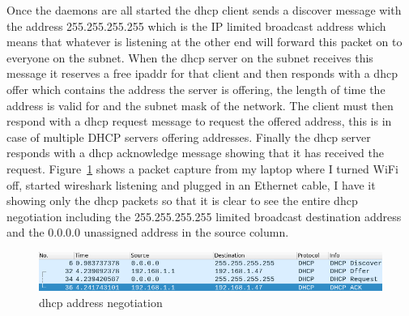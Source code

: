\documentclass[titlepage]{article}
\begin{document}
Once the \glspl{daemon} are all started the \gls{dhcp} client sends a discover message with the address
255.255.255.255 which is the IP limited broadcast address which means that whatever is listening at the
other end will forward this packet on to everyone on the \gls{subnet}. When the \gls{dhcp} \gls{server} on the subnet
receives this message it reserves a free \gls{ipaddr} for that client and then responds with a \gls{dhcp} offer
which contains the address the \gls{server} is offering, the length of time the address is valid for and the
\gls{subnet} mask of the network. The client must then respond with a \gls{dhcp} request message to request the
offered address, this is in case of multiple DHCP servers offering addresses. Finally the \gls{dhcp} server responds
with a \gls{dhcp} acknowledge message showing that it has received the request. Figure~\ref{dhcp_negotiate} shows
a packet capture from my laptop where I turned WiFi off, started wireshark listening and plugged in an Ethernet
cable, I have it showing only the \gls{dhcp} packets so that it is clear to see the entire \gls{dhcp} negotiation
including the 255.255.255.255 limited broadcast destination address and the 0.0.0.0 unassigned address in the source
column.

\begin{figure}[H]
  \centering
  \includegraphics[width=\textwidth]{screenshots/dhcp_negotiation.png}
  \caption{\gls{dhcp} address negotiation}\label{dhcp_negotiate}
\end{figure}
\end{document}
